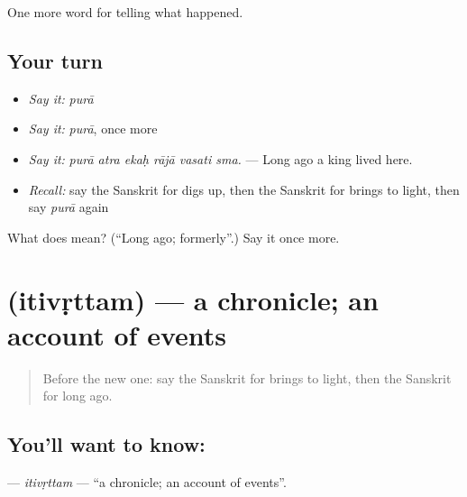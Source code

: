 \begin{grammarlens}[title={What you've built}]
One more word for telling what happened.
\end{grammarlens}

\subsection*{Your turn}
\begin{itemize}
\raggedright
  \item \emph{Say it:} \emph{purā}
  \item \emph{Say it:} \emph{purā}, once more
  \item \emph{Say it:} \emph{purā atra ekaḥ rājā vasati sma.} — Long ago a king lived here.
  \item \emph{Recall:} say the Sanskrit for digs up, then the Sanskrit for brings to light, then say \emph{purā} again
\end{itemize}

\begin{tcolorbox}[breakable,colback=teal!4,colframe=teal!35!black,title={Before you move on}]
What does  mean? (\textquotedblleft{}Long ago; formerly\textquotedblright{}.) Say it once more.
\end{tcolorbox}
\section[\texorpdfstring{\sk{इतिवृत्तम्} (itivṛttam)}{इतिवृत्तम् (itivṛttam)}]{ (itivṛttam) — a chronicle; an account of events}

\label{lesson:SA-C324-itivrttam}



\begin{quote}
Before the new one: say the Sanskrit for brings to light, then the Sanskrit for long ago.
\end{quote}

\subsection*{You'll want to know: }
\textbf{} — \emph{itivṛttam} — \textquotedblleft{}a chronicle; an account of events\textquotedblright{}.

\begin{quote}
    
\end{quote}

